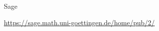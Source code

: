 \documentclass[hyperref={xetex}]{beamer}
\begin{document}
\begin{frame}[fragile]{Sage}
\begin{center}
\url{https://sage.math.uni-goettingen.de/home/pub/2/}
\end{center}
\end{frame}


%
%
%
%
\end{document}
